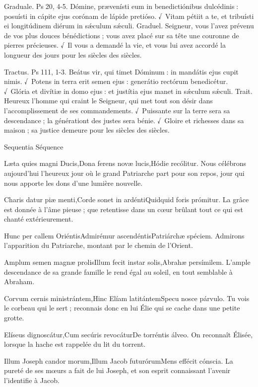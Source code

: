 \begin{paracol}{2}
Graduale. Ps 20, 4-5. Dómine, prævenísti eum in benedictiónibus dulcédinis : posuísti in cápite ejus corónam de lápide pretióso. √~Vitam pétiit a te, et tribuísti ei longitúdinem diérum in sǽculum sǽculi.
\switchcolumn
Graduel. Seigneur, vous l’avez prévenu de vos plus douces bénédictions ; vous avez placé sur sa tête une couronne de pierres précieuses. √~Il vous a demandé la vie, et vous lui avez accordé la longueur des jours pour les siècles des siècles.
\switchcolumn*

Tractus. Ps 111, 1-3. Beátus vir, qui timet Dóminum : in mandátis ejus cupit nimis. √~Potens in terra erit semen ejus : generátio rectórum benedicétur. √~Glória et divítiæ in domo ejus : et justítia ejus manet in sǽculum sǽculi.
\switchcolumn
Trait. Heureux l’homme qui craint le Seigneur, qui met tout son désir dans l’accomplissement de ses commandements. √~Puissante sur la terre sera sa descendance ; la générationt des justes sera bénie. √~Gloire et richesses dans sa maison ; sa justice demeure pour les siècles des siècles.
\switchcolumn*

Sequentia
\switchcolumn
Séquence
\switchcolumn*

Læta quies magni Ducis,Dona ferens novæ lucis,Hódie recólitur.
\switchcolumn
Nous célébrons aujourd’hui l’heureux jour où le grand Patriarche part pour son repos, jour qui nous apporte les dons d’une lumière nouvelle.
\switchcolumn*

Charis datur piæ menti,Corde sonet in ardéntiQuidquid foris prómitur.
\switchcolumn
La grâce est donnée à l’âme pieuse ; que retentisse dans un cœur brûlant tout ce qui est chanté extérieurement.
\switchcolumn*

Hunc per callem OriéntisAdmirémur ascendéntisPatriárchæ spéciem.
\switchcolumn
Admirons l’apparition du Patriarche, montant par le chemin de l’Orient.
\switchcolumn*

Amplum semen magnæ prolisIllum fecit instar solis,Abrahæ persímilem.
\switchcolumn
L’ample descendance de sa grande famille le rend égal au soleil, en tout semblable à Abraham.
\switchcolumn*

Corvum cernis ministrántem,Hinc Elíam latitántemSpecu nosce párvulo.
\switchcolumn
Tu vois le corbeau qui le sert ; reconnais donc en lui Élie qui se cache dans une petite grotte.
\switchcolumn*

Elíseus dignoscátur,Cum secúris revocáturDe torréntis álveo.
\switchcolumn
On reconnaît Élisée, lorsque la hache est rappelée du lit du torrent.
\switchcolumn*

Illum Joseph candor morum,Illum Jacob futurórumMens effécit cónscia.
\switchcolumn
La pureté de ses mœurs a fait de lui Joseph, et son esprit connaissant l’avenir l’identifie à Jacob.
\switchcolumn*


\end{paracol}
